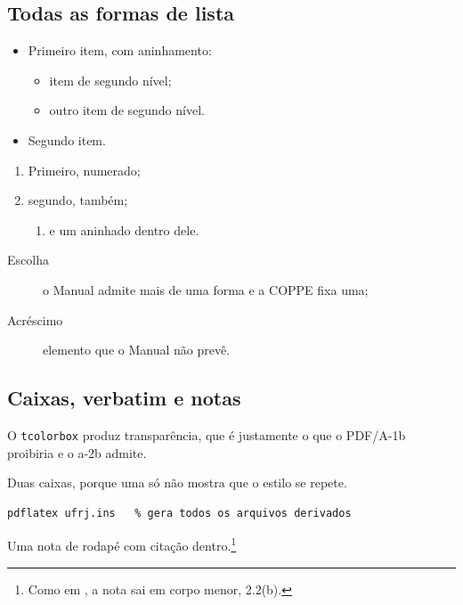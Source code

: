 \documentclass[dsc,pdfa,coorientador,dadoscoleta]{ufrj}
\begin{document}
  \subsection{Todas as formas de lista}
  \begin{itemize}
    \item Primeiro item, com aninhamento:
    \begin{itemize}
      \item item de segundo nível;
      \item outro item de segundo nível.
    \end{itemize}
    \item Segundo item.
  \end{itemize}
  \begin{enumerate}
    \item Primeiro, numerado;
    \item segundo, também;
    \begin{enumerate}
      \item e um aninhado dentro dele.
    \end{enumerate}
  \end{enumerate}
  \begin{description}
    \item[Escolha] o Manual admite mais de uma forma e a COPPE fixa uma;
    \item[Acréscimo] elemento que o Manual não prevê.
  \end{description}

  \subsection{Caixas, verbatim e notas}
  \begin{tcolorbox}[title=Uma caixa com título]
    O \texttt{tcolorbox} produz transparência, que é justamente o que o
    PDF/A-1b proibiria e o a-2b admite.
  \end{tcolorbox}
  \begin{tcolorbox}[colback=white,colframe=black,title=Uma segunda caixa]
    Duas caixas, porque uma só não mostra que o estilo se repete.
  \end{tcolorbox}
  \begin{Verbatim}[frame=single]
  pdflatex ufrj.ins   % gera todos os arquivos derivados
  \end{Verbatim}
  Uma nota de rodapé com citação dentro.\footnote{Como em
  \citet{m-norma}, a nota sai em corpo menor, 2.2(b).}
\end{document}
